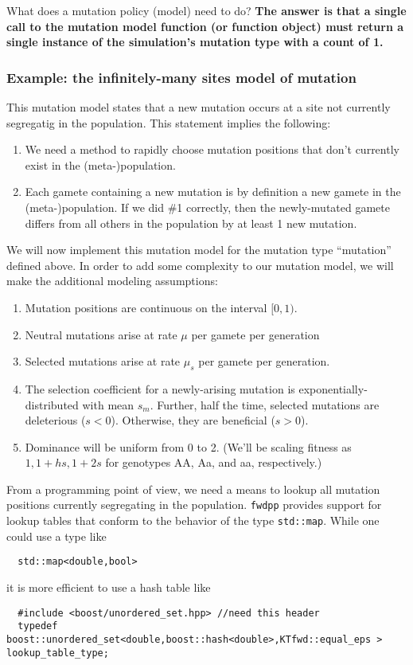 \documentclass{article}
\begin{document}
What does a mutation policy (model) need to do?  \textbf{The answer is that a single call to the mutation model function (or function object) must return a single instance of the simulation's mutation type with a count of 1.}

\subsubsection{Example: the infinitely-many sites model of mutation}
\label{infsites}
This mutation model states that a new mutation occurs at a site not currently segregatig in the population.  This statement implies the following:
\begin{enumerate}
\item We need a method to rapidly choose mutation positions that don't currently exist in the (meta-)population.
\item Each gamete containing a new mutation is by definition a new gamete in the (meta-)population.  If we did \#1 correctly, then the newly-mutated gamete differs from all others in the population by at least 1 new mutation.
\end{enumerate}

We will now implement this mutation model for the mutation type ``mutation'' defined above.  In order to add some complexity to our mutation model, we will make the additional modeling assumptions:
\begin{enumerate}
\item Mutation positions are continuous on the interval $[0,1)$.
\item Neutral mutations arise at rate $\mu$ per gamete per generation
\item Selected mutations arise at rate $\mu_s$ per gamete per generation.
\item The selection coefficient for a newly-arising mutation is exponentially-distributed with mean $s_m$.  Further, half the time, selected mutations are deleterious ($s < 0$).  Otherwise, they are beneficial ($s > 0$).
\item Dominance will be uniform from 0 to 2.  (We'll be scaling fitness as $1, 1+hs, 1+2s$ for genotypes AA, Aa, and aa, respectively.)
\end{enumerate}

From a programming point of view, we need a means to lookup all mutation positions currently segregating in the population.  \texttt{fwdpp} provides support for lookup tables that conform to the behavior of the type \texttt{std::map}.  While one could use a type like 
\begin{lstlisting}
  std::map<double,bool>
\end{lstlisting}
it is more efficient to use a hash table like 
\begin{lstlisting}
  #include <boost/unordered_set.hpp> //need this header
  typedef boost::unordered_set<double,boost::hash<double>,KTfwd::equal_eps > lookup_table_type;
\end{lstlisting}
\end{document}
